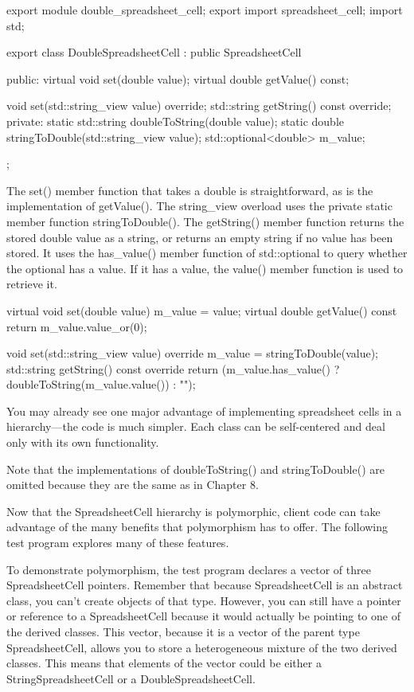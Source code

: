 \begin{cpp}
export module double_spreadsheet_cell;
export import spreadsheet_cell;
import std;

export class DoubleSpreadsheetCell : public SpreadsheetCell
{
    public:
        virtual void set(double value);
        virtual double getValue() const;

        void set(std::string_view value) override;
        std::string getString() const override;
    private:
        static std::string doubleToString(double value);
        static double stringToDouble(std::string_view value);
        std::optional<double> m_value;
};
\end{cpp}

The set() member function that takes a double is straightforward, as is the implementation of getValue(). The string\_view overload uses the private static member function stringToDouble(). The getString() member function returns the stored double value as a string, or returns an empty string if no value has been stored. It uses the has\_value() member function of std::optional to query whether the optional has a value. If it has a value, the value() member function is used to retrieve it.

\begin{cpp}
virtual void set(double value) { m_value = value; }
virtual double getValue() const { return m_value.value_or(0); }

void set(std::string_view value) override { m_value = stringToDouble(value); }
std::string getString() const override
{
    return (m_value.has_value() ? doubleToString(m_value.value()) : "");
}
\end{cpp}

You may already see one major advantage of implementing spreadsheet cells in a hierarchy—the code is much simpler. Each class can be self-centered and deal only with its own functionality.

Note that the implementations of doubleToString() and stringToDouble() are omitted because they are the same as in Chapter 8.


Now that the SpreadsheetCell hierarchy is polymorphic, client code can take advantage of the many benefits that polymorphism has to offer. The following test program explores many of these features.

To demonstrate polymorphism, the test program declares a vector of three SpreadsheetCell pointers. Remember that because SpreadsheetCell is an abstract class, you can’t create objects of that type. However, you can still have a pointer or reference to a SpreadsheetCell because it would actually be pointing to one of the derived classes. This vector, because it is a vector of the parent type SpreadsheetCell, allows you to store a heterogeneous mixture of the two derived classes. This means that elements of the vector could be either a StringSpreadsheetCell or a DoubleSpreadsheetCell.

